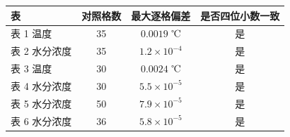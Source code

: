 \begin{tabular}{lccc}
\toprule
表 & 对照格数 & 最大逐格偏差 & 是否四位小数一致 \\
\midrule
表 1 温度 & 35 & $0.0019$ ℃ & 是 \\
表 2 水分浓度 & 35 & $1.2\times10^{-4}$ & 是 \\
表 3 温度 & 30 & $0.0024$ ℃ & 是 \\
表 4 水分浓度 & 30 & $5.5\times10^{-5}$ & 是 \\
表 5 水分浓度 & 50 & $7.9\times10^{-5}$ & 是 \\
表 6 水分浓度 & 36 & $5.8\times10^{-5}$ & 是 \\
\bottomrule
\end{tabular}

